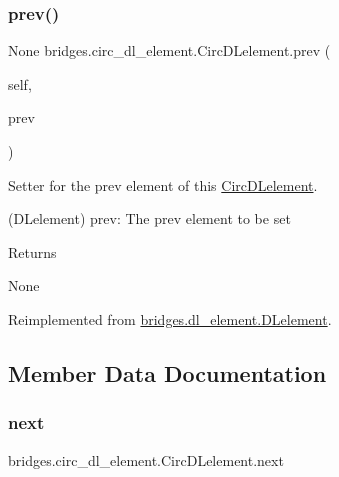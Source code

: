 \subsubsection{\texorpdfstring{prev()}{prev()}\hspace{0.1cm}{\footnotesize\ttfamily [2/2]}}
{\footnotesize\ttfamily  None bridges.\+circ\+\_\+dl\+\_\+element.\+Circ\+D\+Lelement.\+prev (\begin{DoxyParamCaption}\item[{}]{self,  }\item[{}]{prev }\end{DoxyParamCaption})}



Setter for the prev element of this \mbox{\hyperlink{classbridges_1_1circ__dl__element_1_1_circ_d_lelement}{Circ\+D\+Lelement}}. 

\begin{DoxyVerb}       (DLelement) prev: The prev element to be set
\end{DoxyVerb}
 \begin{DoxyReturn}{Returns}


None 
\end{DoxyReturn}


Reimplemented from \mbox{\hyperlink{classbridges_1_1dl__element_1_1_d_lelement_a17c371ec0c38e9555e55551d9be4d185}{bridges.\+dl\+\_\+element.\+D\+Lelement}}.



\subsection{Member Data Documentation}
\mbox{\label{classbridges_1_1circ__dl__element_1_1_circ_d_lelement_a0f01f7ff433628bac241d7c069a476fa}} 
\subsubsection{\texorpdfstring{next}{next}}
{\footnotesize\ttfamily bridges.\+circ\+\_\+dl\+\_\+element.\+Circ\+D\+Lelement.\+next}

\mbox{\label{classbridges_1_1circ__dl__element_1_1_circ_d_lelement_a78ed845303a07e303bcbb39f015843d0}} 
